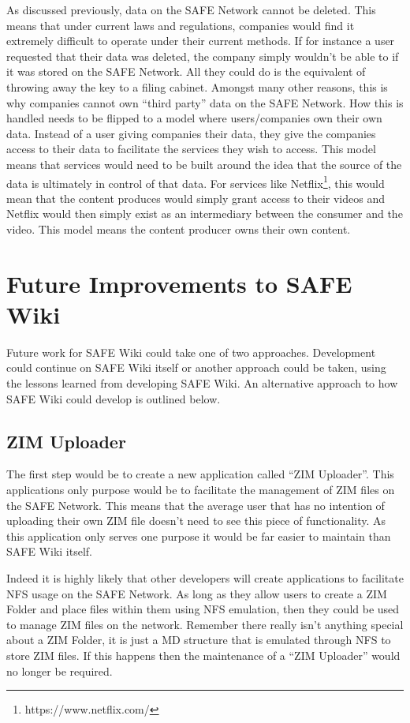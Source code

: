 As discussed previously, data on the SAFE Network cannot be deleted. This means that under current laws and regulations, companies would find it extremely difficult to operate under their current methods. If for instance a user requested that their data was deleted, the company simply wouldn't be able to if it was stored on the SAFE Network. All they could do is the equivalent of throwing away the key to a filing cabinet. Amongst many other reasons, this is why companies cannot own ``third party'' data on the SAFE Network. How this is handled needs to be flipped to a model where users/companies own their own data. Instead of a user giving companies their data, they give the companies access to their data to facilitate the services they wish to access. This model means that services would need to be built around the idea that the source of the data is ultimately in control of that data. For services like Netflix\footnote{https://www.netflix.com/}, this would mean that the content produces would simply grant access to their videos and Netflix would then simply exist as an intermediary between the consumer and the video. This model means the content producer owns their own content.

\section{Future Improvements to SAFE Wiki}

Future work for SAFE Wiki could take one of two approaches. Development could continue on SAFE Wiki itself or another approach could be taken, using the lessons learned from developing SAFE Wiki. An alternative approach to how SAFE Wiki could develop is outlined below.

\subsection{ZIM Uploader}

The first step would be to create a new application called ``ZIM Uploader''. This applications only purpose would be to facilitate the management of ZIM files on the SAFE Network. This means that the average user that has no intention of uploading their own ZIM file doesn't need to see this piece of functionality. As this application only serves one purpose it would be far easier to maintain than SAFE Wiki itself.

Indeed it is highly likely that other developers will create applications to facilitate NFS usage on the SAFE Network. As long as they allow users to create a ZIM Folder and place files within them using NFS emulation, then they could be used to manage ZIM files on the network. Remember there really isn't anything special about a ZIM Folder, it is just a MD structure that is emulated through NFS to store ZIM files. If this happens then the maintenance of a ``ZIM Uploader'' would no longer be required.

